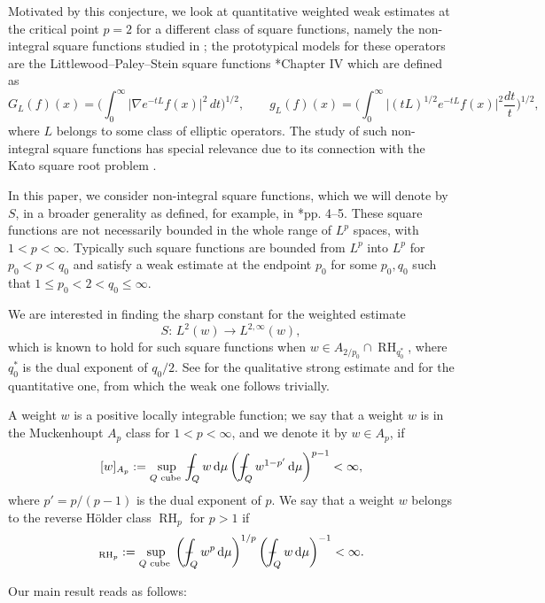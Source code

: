 \documentclass[11pt,reqno]{amsart}
\theoremstyle{plain} %
\def\Xint#1{\mathchoice
   {\XXint\displaystyle\textstyle{#1}}%
   {\XXint\textstyle\scriptstyle{#1}}%
   {\XXint\scriptstyle\scriptscriptstyle{#1}}%
   {\XXint\scriptscriptstyle\scriptscriptstyle{#1}}%
   \!\int}
\def\XXint#1#2#3{{\setbox0=\hbox{$#1{#2#3}{\int}$}
     \vcenter{\hbox{$#2#3$}}\kern-.5\wd0}}
\def\dashint{\Xint-}
\newcommand{\1}{ \mathbbm{1}}   %
\newcommand{\D}{ \, \mathrm{d}} %
\theoremstyle{definition}
\theoremstyle{remark}
\numberwithin{equation}{section}
\begin{document}
Motivated by this conjecture, we look at quantitative weighted weak estimates at the critical point $p=2$ for a different class of square functions, namely the non-integral square functions studied in \cite{AM3}; the prototypical models for these operators are the Littlewood--Paley--Stein square functions \cite{St}*{Chapter IV} which are defined as
$$
G_L(f)(x)=\Big(\int_0^{\infty}\big|\nabla e^{-tL}f(x)\big|^2\,dt\Big)^{1/2},\qquad g_L(f)(x)=\Big(\int_0^{\infty}\big|(tL)^{1/2}e^{-tL}f(x)\big|^2\frac{dt}{t}\Big)^{1/2},
$$
where $L$ belongs to some class of elliptic operators. The study of such non-integral square functions has special relevance due to its connection with the Kato square root problem \cite{Au}. 

In this paper, we consider non-integral square functions, which we will denote by $S$, in a broader generality as defined, for example, in \cite{BBR}*{pp. 4--5}. These square functions are not necessarily bounded in the whole range of $L^p$ spaces, with $1 < p < \infty$. Typically such square functions are bounded from $L^p$ into $L^p$ for $p_0 < p < q_0$ and satisfy a weak estimate at the endpoint $p_0$ for some $p_0, q_0$ such that $1 \leq p_0 < 2 < q_0 \leq \infty$. 

We are interested in finding the sharp constant for the weighted estimate
$$
S:\, L^2(w) \to  L^{2,\infty}(w),
$$
which is known to hold for such square functions when $w\in A_{2/p_0}\cap  \operatorname{RH}_{q_0^*}$, where $q_0^*$ is the dual exponent of $q_0/2$. See \cite{AM3} for the qualitative strong estimate and \cite{BBR} for the quantitative one, from which the weak one follows trivially. 

A weight $w$ is a positive locally integrable function; we say that a weight $w$ is in the Muckenhoupt $A_p$ class for $1<p<\infty$, and we denote it by $w\in A_p$, if
\begin{equation}\label{e.ap}
  [w]_{A_p}:=\sup_{Q \,\,\text{cube }} \dashint_{Q} w \D{\mu}
  \left(\dashint_{Q} w^{1 - p'} \D{\mu} \right)^{p-1}<\infty,
\end{equation}
where $p'=p/(p-1)$ is the dual exponent of $p$.
We say that a weight $w$ belongs to the reverse H\"older class $\operatorname{RH}_p$ for $p>1$ if 
\begin{equation*}
  [w]_{\operatorname{RH}_p}:= \sup_{Q \,\,\text{cube }} \left(\dashint_{Q} w^p \D{\mu} \right)^{1/p} \left( \dashint_{Q} w \D{\mu} \right)^{-1}<\infty.
\end{equation*}

Our main result reads as follows:
\end{document}
